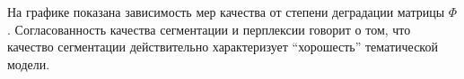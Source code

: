 
На графике показана зависимость мер качества от степени деградации матрицы $\Phi$. Согласованность качества сегментации и перплексии говорит о том, что качество сегментации действительно характеризует ``хорошесть'' тематической модели.